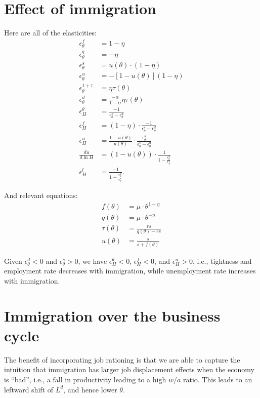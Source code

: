 \documentclass[12pt]{article}
\begin{document}
\section{Effect of immigration}
Here are all of the elasticities:
\begin{align*}
    \epsilon^f_\theta &= 1 - \eta \\
    \epsilon^q_\theta &= - \eta \\
    \epsilon^s_\theta &= u(\theta) \cdot (1 - \eta) \\
    \epsilon^u_\theta &= -[1-u(\theta)] (1-\eta) \\
    \epsilon^{1+\tau}_\theta &= \eta \tau(\theta) \\
    \epsilon^d_\theta &= \frac{-\alpha}{1-\alpha} \eta \tau(\theta) \\
    \epsilon^\theta_H &= \frac{-1}{\epsilon^s_\theta - \epsilon^d_\theta} \\
    \epsilon^f_H &= (1-\eta) \cdot \frac{-1}{\epsilon^s_\theta - \epsilon^d_\theta} \\
    \epsilon^u_H &= \frac{1 - u(\theta)}{u(\theta)} \cdot \frac{\epsilon^s_\theta}{\epsilon^s_\theta - \epsilon^d_\theta} \\
    \frac{d u}{d \ln H} &= (1 - u(\theta)) \cdot \frac{1}{1 - \frac{\epsilon^d_\theta}{\epsilon^s_\theta}} \\
    \epsilon^l_H &= \frac{-1}{1 - \frac{\epsilon^d_\theta}{\epsilon^s_\theta}}.
\end{align*}

And relevant equations:
\begin{align*}
    f(\theta) &= \mu \cdot \theta^{1-\eta} \\
    q(\theta) &= \mu \cdot \theta^{-\eta} \\
    \tau(\theta) &= \frac{rs}{q(\theta) - rs} \\
    u(\theta) &= \frac{s}{s + f(\theta)}
\end{align*}

Given $\epsilon^d_\theta < 0$ and $\epsilon^s_\theta > 0$, we have $\epsilon^\theta_H < 0$, $\epsilon^f_H < 0$, and $\epsilon^u_H > 0$, i.e., tightness and employment rate decreases with immigration, while unemployment rate increases with immigration.

\section{Immigration over the business cycle}
The benefit of incorporating job rationing is that we are able to capture the intuition that immigration has larger job displacement effects when the economy is ``bad'', i.e., a fall in productivity leading to a high $w/a$ ratio.
This leads to an leftward shift of $L^d$, and hence lower $\theta$.
\end{document}
